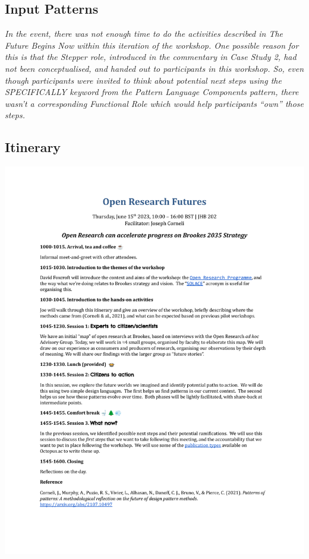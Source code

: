 \documentclass[acmlarge,timestamp]{acmart}
\begin{document}
\subsection{Input Patterns}







\smallskip
\noindent \emph{In the event, there was not enough time to do the
activities described in {\sc The Future Begins Now} within this
iteration of the workshop.  One possible reason for this is that the
{\sc Stepper} role, introduced in the commentary in Case Study 2, had
not been conceptualised, and handed out to participants in this
workshop.  So, even though participants were invited to think about
potential next steps using the \emph{SPECIFICALLY} keyword from the
{\sc Pattern Language Components} pattern, there wasn’t a
corresponding {\sc Functional Role} which would help participants
“own” those steps.}
\clearpage

\subsection{Itinerary}

\begin{mdframed}[backgroundcolor=blue!50,linecolor=blue!50]
  \noindent\includegraphics[width=\textwidth,trim={1cm 5.5cm 1cm 4.5cm},clip=true]{brookes}
\end{mdframed}
\end{document}
